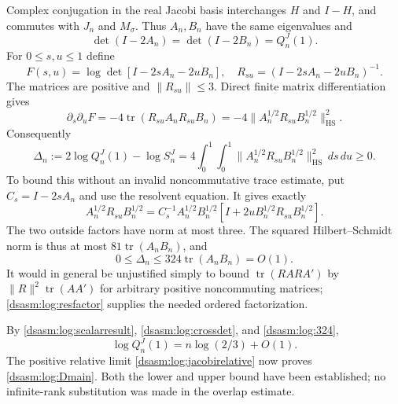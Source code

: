 \documentclass[11pt,letterpaper]{article}
\theoremstyle{remark}\newtheorem{remark}[theorem]{Remark}
\newcommand{\HS}{\mathrm{HS}}
\DeclareMathOperator{\tr}{tr}\DeclareMathOperator{\Ran}{Ran}
\begin{document}
Complex conjugation in the real Jacobi basis interchanges $H$ and
$I-H$, and commutes with $J_n$ and $M_\sigma$. Thus $A_n,B_n$ have
the same eigenvalues and
\[
 \det(I-2A_n)=\det(I-2B_n)=Q_n^J(1).
\]
For $0\le s,u\le1$ define
\[
 F(s,u)=\log\det[I-2sA_n-2uB_n],\quad
 R_{su}=(I-2sA_n-2uB_n)^{-1}.
\]
The matrices are positive and $\|R_{su}\|\le3$. Direct finite
matrix differentiation gives
\[
 \partial_s\partial_u F
 =-4\tr(R_{su}A_nR_{su}B_n)
 =-4\|A_n^{1/2}R_{su}B_n^{1/2}\|_\HS^2.
\]
Consequently
\begin{equation}\label{dsasm:log:mixedgap}
 \Delta_n:=2\log Q_n^J(1)-\log S_n^J
 =4\int_0^1\int_0^1
           \|A_n^{1/2}R_{su}B_n^{1/2}\|_\HS^2\,ds\,du\ge0.
\end{equation}
To bound this without an invalid noncommutative trace estimate,
put $C_s=I-2sA_n$ and use the resolvent equation. It gives exactly
\begin{equation}\label{dsasm:log:resfactor}
 A_n^{1/2}R_{su}B_n^{1/2}
 =C_s^{-1}A_n^{1/2}B_n^{1/2}
             [I+2uB_n^{1/2}R_{su}B_n^{1/2}].
\end{equation}
The two outside factors have norm at most three. The squared
Hilbert--Schmidt norm is thus at most $81\tr(A_nB_n)$, and
\begin{equation}\label{dsasm:log:324}
 0\le\Delta_n\le324\tr(A_nB_n)=O(1).
\end{equation}
It would in general be unjustified simply to bound
$\tr(RARA')$ by $\|R\|^2\tr(AA')$ for arbitrary positive
noncommuting matrices; \eqref{dsasm:log:resfactor} supplies the needed
ordered factorization.

By \eqref{dsasm:log:scalarresult}, \eqref{dsasm:log:crossdet}, and \eqref{dsasm:log:324},
\[
 \log Q_n^J(1)=n\log(2/3)+O(1).
\]
The positive relative limit \eqref{dsasm:log:jacobirelative} now proves
\eqref{dsasm:log:Dmain}. Both the lower and upper bound have been established;
no infinite-rank substitution was made in the overlap estimate.
\end{document}
